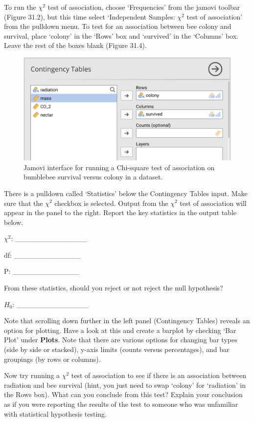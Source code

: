 \documentclass[
]{scrbook}
\begin{document}
To run the \(\chi^{2}\) test of association, choose `Frequencies' from the jamovi toolbar (Figure 31.2), but this time select `Independent Samples: \(\chi^{2}\) test of association' from the pulldown menu.
To test for an association between bee colony and survival, place `colony' in the `Rows' box and `survived' in the `Columns' box.
Leave the rest of the boxes blank (Figure 31.4).

\begin{figure}
\includegraphics[width=1\linewidth]{img/jamovi_test_of_association_interface} \caption{Jamovi interface for running a Chi-square test of association on bumblebee survival versus colony in a dataset.}\label{fig:unnamed-chunk-154}
\end{figure}

There is a pulldown called `Statistics' below the Contingency Tables input.
Make sure that the \(\chi^{2}\) checkbox is selected.
Output from the \(\chi^{2}\) test of association will appear in the panel to the right.
Report the key statistics in the output table below.

\(\chi^{2}\): \_\_\_\_\_\_\_\_\_\_\_\_\_\_

df: \_\_\_\_\_\_\_\_\_\_\_\_\_

P: \_\_\_\_\_\_\_\_\_\_\_\_\_

From these statistics, should you reject or not reject the null hypothesis?

\(H_{0}\): \_\_\_\_\_\_\_\_\_\_\_\_\_\_

Note that scrolling down further in the left panel (Contingency Tables) reveals an option for plotting.
Have a look at this and create a barplot by checking `Bar Plot' under \textbf{Plots}.
Note that there are various options for changing bar types (side by side or stacked), y-axis limits (counts versus percentages), and bar groupings (by rows or columns).

Now try running a \(\chi^{2}\) test of association to see if there is an association between radiation and bee survival (hint, you just need to swap `colony' for `radiation' in the Rows box).
What can you conclude from this test?
Explain your conclusion as if you were reporting the results of the test to someone who was unfamiliar with statistical hypothesis testing.
\end{document}
